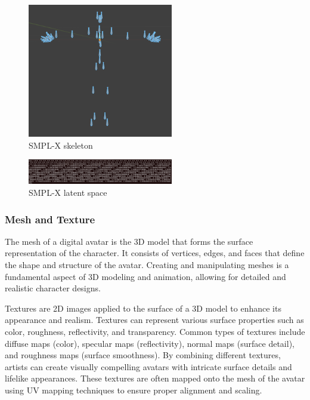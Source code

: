 \documentclass[../../main.tex]{subfiles}
\begin{document}
\begin{figure} 
  \centering \includegraphics[width = 2.5in]{chapters/background_work/images/smpl_x_skeleton.png} 
  \caption{SMPL-X skeleton} 
  \label{fig:smpl_x_skeleton} 
\end{figure}

\begin{figure} 
  \centering \includegraphics[width = 2.5in]{chapters/background_work/images/latent_space_smplx.png} 
  \caption{SMPL-X latent space} 
  \label{fig:latent_space_smplx} 
\end{figure}

\subsubsection{Mesh and Texture}
\label{subsubsec:mesh_and_texture}

The mesh of a digital avatar is the 3D model that forms the surface representation of the character. It consists of vertices, edges, and faces that define the shape and structure of the avatar. Creating and manipulating meshes is a fundamental aspect of 3D modeling and animation, allowing for detailed and realistic character designs.

Textures are 2D images applied to the surface of a 3D model to enhance its appearance and realism. Textures can represent various surface properties such as color, roughness, reflectivity, and transparency. Common types of textures include diffuse maps (color), specular maps (reflectivity), normal maps (surface detail), and roughness maps (surface smoothness). By combining different textures, artists can create visually compelling avatars with intricate surface details and lifelike appearances. These textures are often mapped onto the mesh of the avatar using UV mapping techniques to ensure proper alignment and scaling.
\end{document}
